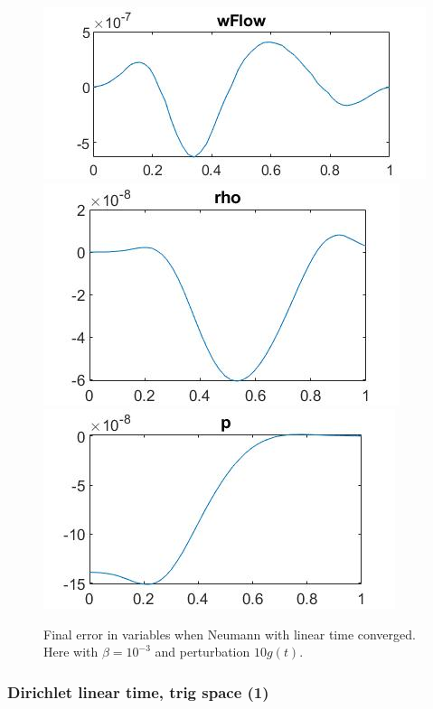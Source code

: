 \documentclass[11pt, a4paper]{article}
\theoremstyle{definition}
\begin{document}
\begin{figure}[h]
	\includegraphics[scale=0.35]{linNfin1.jpg}
	\includegraphics[scale=0.35]{linNfin2.jpg}
	\includegraphics[scale=0.35]{linNfin3.jpg}
	\caption{Final error in variables when Neumann with linear time converged. Here with $\beta =10^{-3}$ and perturbation $10g(t)$.}
	\label{Figlint3}
\end{figure}

\subsubsection*{Dirichlet linear time, trig space (1)}
\end{document}
